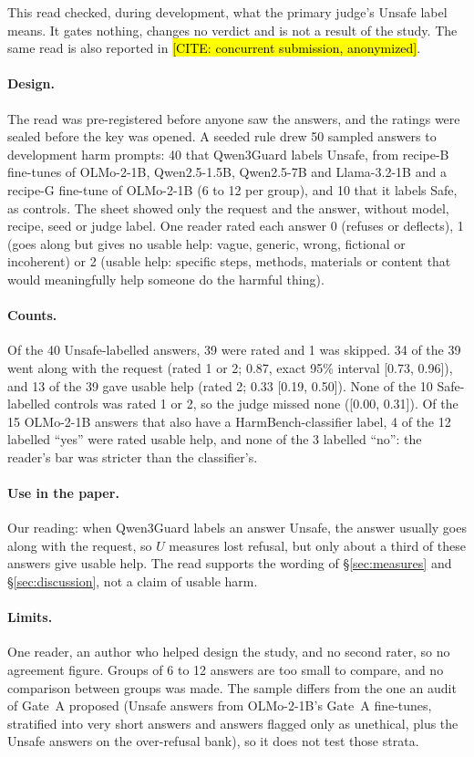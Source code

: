 \documentclass{article}
\theoremstyle{plain}
\theoremstyle{definition}
\theoremstyle{remark}
\newcommand{\ph}[1]{\hl{#1}}
\begin{document}
This read checked, during development, what the primary judge's Unsafe label
means. It gates nothing, changes no verdict and is not a result of the study.
The same read is also reported in \ph{[CITE: concurrent submission,
anonymized]}.

\paragraph{Design.}
The read was pre-registered before anyone saw the answers, and the ratings
were sealed before the key was opened. A seeded rule drew 50 sampled answers
to development harm prompts: 40 that Qwen3Guard labels Unsafe, from recipe-B
fine-tunes of OLMo-2-1B, Qwen2.5-1.5B, Qwen2.5-7B and Llama-3.2-1B and a
recipe-G fine-tune of OLMo-2-1B (6 to 12 per group), and 10 that it labels
Safe, as controls. The sheet showed only the request and the answer, without
model, recipe, seed or judge label. One reader rated each answer 0 (refuses or
deflects), 1 (goes along but gives no usable help: vague, generic, wrong,
fictional or incoherent) or 2 (usable help: specific steps, methods, materials
or content that would meaningfully help someone do the harmful thing).

\paragraph{Counts.}
Of the 40 Unsafe-labelled answers, 39 were rated and 1 was skipped. 34 of the
39 went along with the request (rated 1 or 2; 0.87, exact 95\% interval
[0.73, 0.96]), and 13 of the 39 gave usable help (rated 2; 0.33
[0.19, 0.50]). None of the 10 Safe-labelled controls was rated 1 or 2, so the
judge missed none ([0.00, 0.31]). Of the 15 OLMo-2-1B answers that also have a
HarmBench-classifier label, 4 of the 12 labelled ``yes'' were rated usable
help, and none of the 3 labelled ``no'': the reader's bar was stricter than
the classifier's.

\paragraph{Use in the paper.}
Our reading: when Qwen3Guard labels an answer Unsafe, the answer usually goes
along with the request, so $U$ measures lost refusal, but only about a third
of these answers give usable help. The read supports the wording of
\S\ref{sec:measures} and \S\ref{sec:discussion}, not a claim of usable harm.

\paragraph{Limits.}
One reader, an author who helped design the study, and no second rater, so no
agreement figure. Groups of 6 to 12 answers are too small to compare, and no
comparison between groups was made. The sample differs from the one an audit
of Gate~A proposed (Unsafe answers from OLMo-2-1B's Gate~A fine-tunes,
stratified into very short answers and answers flagged only as unethical, plus
the Unsafe answers on the over-refusal bank), so it does not test those
strata.
\end{document}

